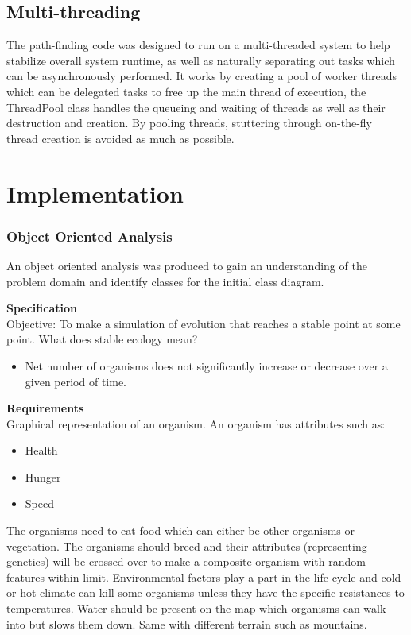 \documentclass[a4paper, oneside, 11pt]{report}
\begin{document}
\section{Multi-threading} \label{multithreading}
The path-finding code was designed to run on a multi-threaded system to help stabilize overall system runtime, as well as naturally separating out tasks which can be asynchronously performed. It works by creating a pool of worker threads which can be delegated tasks to free up the main thread of execution, the ThreadPool class handles the queueing and waiting of threads as well as their destruction and creation. By pooling threads, stuttering through on-the-fly thread creation is avoided as much as possible.

\chapter{Implementation} \label{implementation}

\subsection{Object Oriented Analysis}\label{ooa}
An object oriented analysis was produced to gain an understanding of the problem domain and identify classes for the initial class diagram.

\textbf{Specification} \\
Objective: To make a simulation of evolution that reaches a stable point at some point.
What does stable ecology mean? 
\begin{itemize}
\item Net number of organisms does not significantly increase or decrease over a given period of time.
\end{itemize}
\textbf{Requirements} \\
Graphical representation of an organism.
An organism has attributes such as:
\begin{itemize}
\item Health 
\item Hunger 
\item Speed
\end{itemize}
The organisms need to eat food which can either be other organisms or vegetation. 
The organisms should breed and their attributes (representing genetics) will be crossed over to make a composite organism with random features within limit. 
Environmental factors play a part in the life cycle and cold or hot climate can kill some organisms unless they have the specific resistances to temperatures. 
Water should be present on the map which organisms can walk into but slows them down. Same with different terrain such as mountains. 
\end{document}
